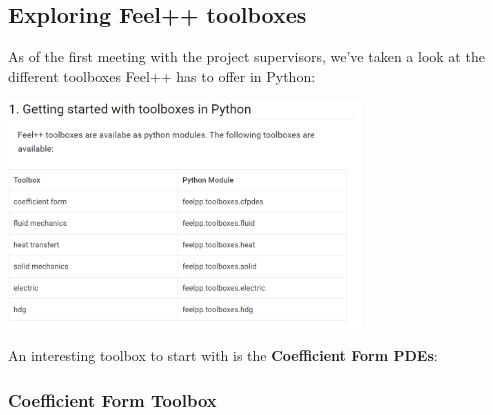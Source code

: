 \documentclass[12pt]{article}
\begin{document}
\newpage
\subsection{Exploring Feel++ toolboxes}

As of the first meeting with the project supervisors, we've taken a look at the different toolboxes Feel++ has to offer in Python:
\begin{frame}{}
    \begin{center}
        \includegraphics[width=0.7\textwidth]{images/pyfeelpptoolboxes.png}
    \end{center}
\end{frame}

An interesting toolbox to start with is the \textbf{Coefficient Form PDEs}:

\subsubsection{Coefficient Form Toolbox}
\end{document}
